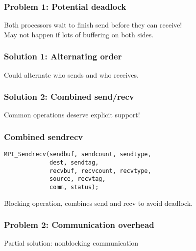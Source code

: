 \documentclass{beamer}
\begin{document}
\begin{frame}
  \frametitle{Problem 1: Potential deadlock}
  
  \begin{center}
    
  \end{center}
  Both processors wait to finish send before they can receive! \\
  May not happen if lots of buffering on both sides.

\end{frame}


\begin{frame}
  \frametitle{Solution 1: Alternating order}

  \begin{center}
    
  \end{center}
  Could alternate who sends and who receives.

\end{frame}


\begin{frame}
  \frametitle{Solution 2: Combined send/recv}

  \begin{center}
    
  \end{center}
  Common operations deserve explicit support!

\end{frame}


\begin{frame}[fragile]
  \frametitle{Combined sendrecv}

\begin{verbatim}
MPI_Sendrecv(sendbuf, sendcount, sendtype,
             dest, sendtag, 
             recvbuf, recvcount, recvtype, 
             source, recvtag,
             comm, status);
\end{verbatim}
Blocking operation, combines send and recv to avoid deadlock.

\end{frame}


\begin{frame}
  \frametitle{Problem 2: Communication overhead}

  \begin{center}
    
  \end{center}
  Partial solution: nonblocking communication
  
\end{frame}
\end{document}
